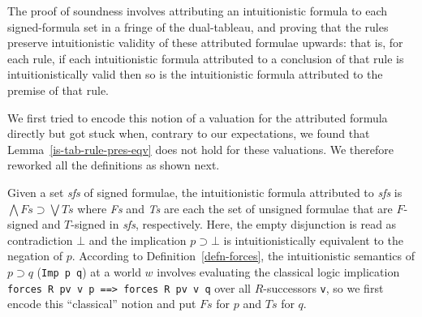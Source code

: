\documentclass[a4paper]{article}
\begin{document}

The proof of soundness involves attributing an intuitionistic formula
to each signed-formula set in a fringe of the dual-tableau, and proving
that the rules preserve intuitionistic validity of these attributed
formulae upwards: that is, for each rule, if each intuitionistic
formula attributed to a conclusion of that rule is intuitionistically
valid then so is the intuitionistic formula attributed to the premise
of that rule.

We first tried to encode this notion of a valuation for the
attributed formula directly but got
stuck when, contrary to our expectations, we found that
Lemma~\ref{is-tab-rule-pres-eqv} does not hold for these
valuations. We therefore reworked all the definitions as shown next.


Given a set \textit{sfs} of signed formulae, the intuitionistic
formula attributed to \textit{sfs} is
$\bigwedge Fs \supset \bigvee Ts$ where \textit{Fs} and \textit{Ts}
are each the set of unsigned formulae that are $F$-signed and
$T$-signed in \textit{sfs}, respectively.  Here, 
the empty disjunction is read as contradiction $\bot$ and 
the implication $p \supset \bot$ is intuitionistically equivalent to
the negation of $p$.
According to
Definition~\ref{defn-forces}, the intuitionistic semantics of
$p \supset q$ (\texttt{Imp p q}) at a world $w$
involves evaluating the classical
logic implication \texttt{forces R pv v p ==> forces R pv v q} over
all $R$-successors
\texttt{v}, so we first encode this ``classical'' notion and put
$Fs$ for $p$ and $Ts$ for $q$.
\end{document}
